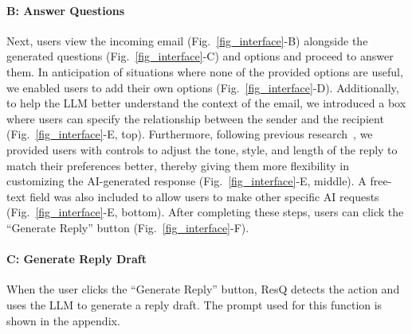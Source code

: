 \paragraph{\textbf{B: Answer Questions}}
Next, users view the incoming email (Fig.~\ref{fig_interface}-B) alongside the generated questions (Fig.~\ref{fig_interface}-C) and options and proceed to answer them. 
In anticipation of situations where none of the provided options are useful, we enabled users to add their own options (Fig.~\ref{fig_interface}-D). 
Additionally, to help the LLM better understand the context of the email, we introduced a box where users can specify the relationship between the sender and the recipient (Fig.~\ref{fig_interface}-E, top). 
Furthermore, following previous research~\cite{fu2024text}, we provided users with controls to adjust the tone, style, and length of the reply to match their preferences better, thereby giving them more flexibility in customizing the AI-generated response (Fig.~\ref{fig_interface}-E, middle). 
A free-text field was also included to allow users to make other specific AI requests (Fig.~\ref{fig_interface}-E, bottom). 
After completing these steps, users can click the ``Generate Reply'' button (Fig.~\ref{fig_interface}-F).

\paragraph{\textbf{C: Generate Reply Draft}}
When the user clicks the ``Generate Reply'' button, ResQ detects the action and uses the LLM to generate a reply draft.
The prompt used for this function is shown in the appendix.

